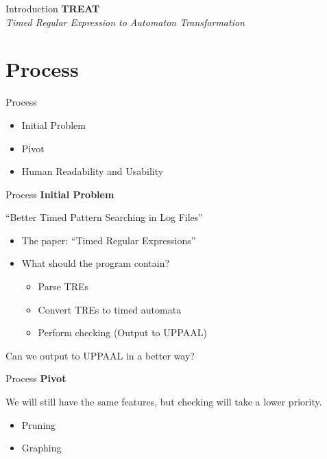 
\begin{frame}{Introduction}
    \centering
    \LARGE\textbf{TREAT} \\
    \vspace{0.5cm}
    \Large\textit{Timed Regular Expression to Automaton Transformation}
\end{frame}

\section{Process}

\begin{frame}{Process}
    \begin{itemize}
        \item Initial Problem
        \item Pivot
        \item Human Readability and Usability
    \end{itemize}
\end{frame}

\begin{frame}{Process}
    \textbf{Initial Problem}

    ``Better Timed Pattern Searching in Log Files''
    \newline
    \begin{itemize}
        \item The paper: ``Timed Regular Expressions''
        \item What should the program contain?
        \begin{itemize}
            \item Parse TREs
            \item Convert TREs to timed automata
            \item Perform checking (Output to UPPAAL)
        \end{itemize}
    \end{itemize}

    Can we output to UPPAAL in a better way?
\end{frame}

\begin{frame}{Process}
    \textbf{Pivot}

    We will still have the same features, but checking will take a lower priority.
    \newline
    \begin{itemize}
        \item Pruning
        \item Graphing
    \end{itemize}
\end{frame}

